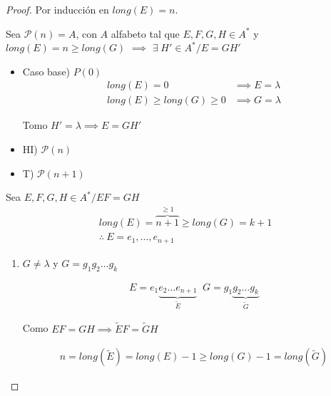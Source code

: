 \begin{proof} \phantom{.}

   Por inducción en $long(E) = n$.

   Sea $\mathcal{P}(n) = A$, con $A$ alfabeto tal que $E, F, G, H \in A^{*}$
   y $long(E) = n \geq long(G)$ $\implies$ $\exists \; H' \in A^{*} / E = GH'$

   \begin{itemize}
       \item Caso base) $P(0)$ 
           \begin{align*}
                long(E) = 0 &\implies E = \lambda \\
                long(E) \geq long(G) \geq 0 &\implies G = \lambda
           \end{align*}

           Tomo $H' = \lambda \implies E = GH'$

    \item HI) $\mathcal{P}(n)$

    \item T) $\mathcal{P}(n+1)$

   \end{itemize}

   \bigskip 

   Sea $E, F, G, H \in A^{*} / EF = GH$
   \begin{gather*}
       long(E) = \overbrace{n+1}^{\geq 1} \geq long(G) = k+1 \\
       \therefore ~  E = e_1, \dotsc, e_{n+1}
   \end{gather*}

    \begin{enumerate}[%
        labelindent=*,
        style=multiline,
        leftmargin=*,
        align=left,
        leftmargin=2\parindent,
        label=Caso \arabic*)]
        \item $G \neq \lambda$ y $G = g_1 g_2 \dots g_k$
           
            \begin{gather*}
                E = e_1 \underbrace{e_2 \dots e_{n+1}}_{\widetilde{E}} \; \; 
                G = g_1 \underbrace{g_2 \dots g_k}_{\widetilde{G}} 
            \end{gather*}

            Como $EF = GH \implies \widetilde{E} F = \widetilde{G}H$

            \begin{gather*}
                n = long(\widetilde{E}) = long(E) - 1 
                \geq long(G)-1 = long(\widetilde{G})
            \end{gather*}


\end{enumerate}
\end{proof}
